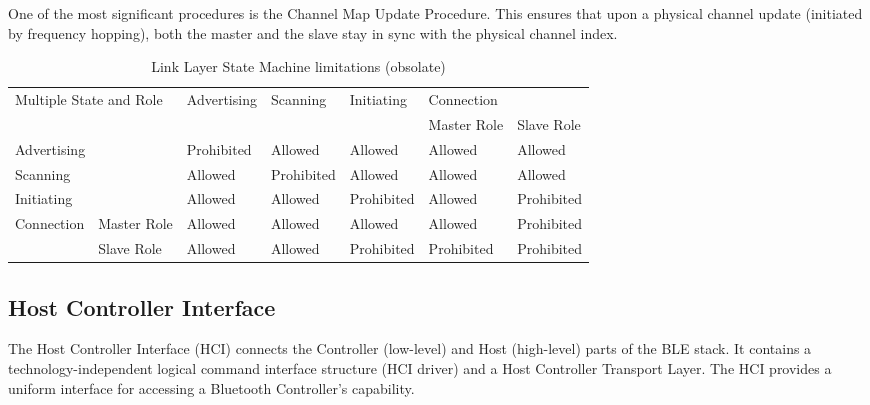 One of the most significant procedures is the Channel Map Update Procedure.
This ensures that upon a physical channel update (initiated by
frequency hopping), both the master and the slave stay in sync
with the physical channel index.

\begin{table}[]
    \begin{tabular}{lllllll}
    \multicolumn{2}{l}{\multirow{2}{*}{Multiple State and Role}}  & \multirow{2}{*}{Advertising} & \multirow{2}{*}{Scanning} & \multirow{2}{*}{Initiating} & \multicolumn{2}{l}{Connection} \\
    \multicolumn{2}{l}{}                                          &                              &                           &                             & Master Role    & Slave Role    \\
    \multicolumn{2}{l}{Advertising}                               & Prohibited                   & Allowed                   & Allowed                     & Allowed        & Allowed       \\
    \multicolumn{2}{l}{Scanning}                                  & Allowed                      & Prohibited                & Allowed                     & Allowed        & Allowed       \\
    \multicolumn{2}{l}{Initiating}                                & Allowed                      & Allowed                   & Prohibited                  & Allowed        & Prohibited    \\
    \multicolumn{1}{c}{\multirow{2}{*}{Connection}} & Master Role & Allowed                      & Allowed                   & Allowed                     & Allowed        & Prohibited    \\
    \multicolumn{1}{c}{}                            & Slave Role  & Allowed                      & Allowed                   & Prohibited                  & Prohibited     & Prohibited   
    \end{tabular}
    \caption{Link Layer State Machine limitations (obsolate)}
    \label{tab:llstate_limit}
    \end{table}

\subsection{Host Controller Interface}
The Host Controller Interface (HCI) connects the Controller (low-level)
and Host (high-level) parts of the BLE stack.
It contains a technology-independent logical command interface structure
(HCI driver) and a Host Controller Transport Layer.
The HCI provides a uniform interface for accessing a Bluetooth Controller's
capability.

